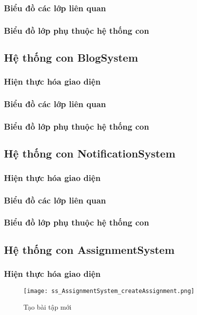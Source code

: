 \documentclass[./../main.tex]{subfiles}
\begin{document}
\subsubsection{Biểu đồ các lớp liên quan}
\subsubsection{Biểu đồ lớp phụ thuộc hệ thống con}

\subsection{Hệ thống con BlogSystem}
\subsubsection{Hiện thực hóa giao diện}
\subsubsection{Biểu đồ các lớp liên quan}
\subsubsection{Biểu đồ lớp phụ thuộc hệ thống con}

\subsection{Hệ thống con NotificationSystem}
\subsubsection{Hiện thực hóa giao diện}
\subsubsection{Biểu đồ các lớp liên quan}
\subsubsection{Biểu đồ lớp phụ thuộc hệ thống con}

\subsection{Hệ thống con AssignmentSystem}
\subsubsection{Hiện thực hóa giao diện}
\begin{figure}[H]
    \centering
    \texttt{[image: ss\_AssignmentSystem\_createAssignment.png]}
    \caption{Tạo bài tập mới}
    \label{ss_as_ca}
\end{figure}
\end{document}
